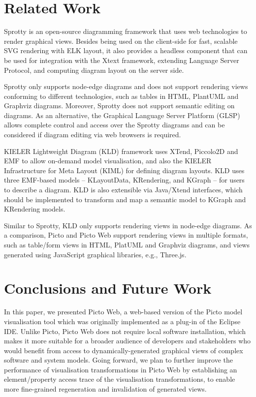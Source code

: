 \documentclass[sigconf,review]{acmart}
\begin{document}
\section{Related Work}
Sprotty \cite{sprotty2022git} is an open-source diagramming framework that uses web technologies to render graphical views. 
Besides being used on the client-side for fast, scalable SVG rendering with ELK layout, it also provides a headless component that can be used for integration with the Xtext framework, extending Language Server Protocol, and computing diagram layout on the server side. 

Sprotty only supports node-edge diagrams and does not support rendering views conforming to different technologies, such as tables in HTML, PlantUML and Graphviz diagrams. Moreover, Sprotty does not support semantic editing on diagrams. As an alternative, the Graphical Language Server Platform (GLSP) \cite{eclipse2022glsp} allows complete control and access over the Sprotty diagrams and can be considered if diagram editing via web browsers is required.

KIELER Lightweight Diagram (KLD) framework \cite{schneider2013just} uses XTend, Piccolo2D and EMF to allow on-demand model visualisation, and also the KIELER Infrastructure for Meta Layout (KIML) for defining diagram layouts. KLD uses three EMF-based models -- KLayoutData, KRendering, and KGraph -- for users to describe a diagram. KLD is also extensible via Java/Xtend interfaces, which should be implemented to transform and map a semantic model to KGraph and KRendering models. 

Similar to Sprotty, KLD only supports rendering views in node-edge diagrams. As a comparison, Picto and Picto Web support rendering views in multiple formats, such as table/form views in HTML, PlatUML and Graphviz diagrams, and views generated using JavaScript graphical libraries, e.g., Three.js.


\section{Conclusions and Future Work}
\label{sec:conclusions_and_future_work}

In this paper, we presented Picto Web, a web-based version of the Picto model visualisation tool which was originally implemented as a plug-in of the Eclipse IDE. Unlike Picto, Picto Web does not require local software installation, which makes it more suitable for a broader audience of developers and stakeholders who would benefit from access to dynamically-generated graphical views of complex software and system models. Going forward, we plan to further improve the performance of visualisation transformations in Picto Web by establishing an element/property access trace of the visualisation transformations, to enable more fine-grained regeneration and invalidation of generated views.




\end{document}
